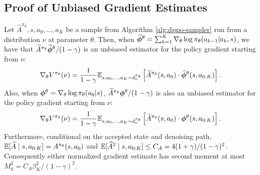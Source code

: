 \subsection{Proof of Unbiased Gradient Estimates}

\begin{lem}
    Let $\widehat{A}^{\pi_\theta}, s, a_0,...,a_K$ be a sample from Algorithm \ref{alg:dppo-sampler} run from a distribution $\nu$ at parameter $\theta$. Then, when $\widehat{\boldsymbol{\phi}}^{\theta} = \sum_{k=1}^K \nabla_\theta \log \pi_\theta(a_{k-1} | a_k, s)$, we have that $\widehat{A}^{\pi_\theta}\widehat{\boldsymbol{\phi}}^{\theta}/(1-\gamma)$ is an unbiased estimator for the policy gradient starting from $\nu$:
    $$\nabla_\theta V^{\pi_\theta}(\nu) = \frac{1}{1-\gamma}\mathbb{E}_{s,a_0,...,a_K \sim d_{\nu}^{\pi_\theta}}\left[\widehat{A}^{\pi_\theta}(s,a_0) \cdot \widehat{\boldsymbol{\phi}}^{\theta}(s,a_{0:K})\right].$$
    Also, when $\boldsymbol{\phi}^\theta = \nabla_\theta \log \pi_\theta(a_0 | s)$, $\widehat{A}^{\pi_\theta}{\boldsymbol{\phi}}^{\theta}/(1-\gamma)$ is also an unbiased estimator for the policy gradient starting from $\nu$:
    $$\nabla_\theta V^{\pi_\theta}(\nu) = \frac{1}{1-\gamma}\mathbb{E}_{s,a_0,...,a_K \sim d_{\nu}^{\pi_\theta}}\left[\widehat{A}^{\pi_\theta}(s,a_0) \cdot {\boldsymbol{\phi}}^{\theta}(s,a_{0:K})\right].$$
    \label{lem:unbiased-vanilla-pg}
Furthermore, conditional on the accepted state and denoising path,
$\mathbb{E}[\widehat A\mid s,a_{0:K}]=A^{\pi_\theta}(s,a_0)$ and
$\mathbb{E}[\widehat A^2\mid s,a_{0:K}]\leq C_A=4(1+\gamma)/(1-\gamma)^2$.
Consequently either normalized gradient estimate has second moment at most
$M_g^2=C_A\beta_K^2/(1-\gamma)^2$.
\end{lem}

